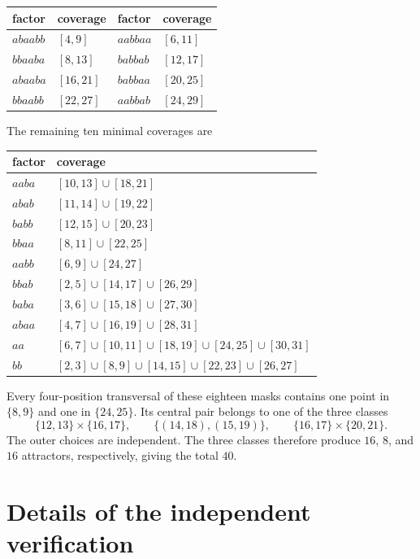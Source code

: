\documentclass[10pt,a4paper]{article}
\theoremstyle{definition}\newtheorem{definition}[theorem]{Definition}
\theoremstyle{remark}\newtheorem{remark}[theorem]{Remark}
\begin{document}
\begin{center}
\begin{tabular}{ll@{\qquad}ll}
\toprule
factor & coverage & factor & coverage\\
\midrule
$abaabb$ & $[4,9]$ & $aabbaa$ & $[6,11]$\\
$bbaaba$ & $[8,13]$ & $babbab$ & $[12,17]$\\
$abaaba$ & $[16,21]$ & $babbaa$ & $[20,25]$\\
$bbaabb$ & $[22,27]$ & $aabbab$ & $[24,29]$\\
\bottomrule
\end{tabular}
\end{center}

The remaining ten minimal coverages are

\begin{center}
\begin{tabular}{ll}
\toprule
factor & coverage\\
\midrule
$aaba$ & $[10,13]\cup[18,21]$\\
$abab$ & $[11,14]\cup[19,22]$\\
$babb$ & $[12,15]\cup[20,23]$\\
$bbaa$ & $[8,11]\cup[22,25]$\\
$aabb$ & $[6,9]\cup[24,27]$\\
$bbab$ & $[2,5]\cup[14,17]\cup[26,29]$\\
$baba$ & $[3,6]\cup[15,18]\cup[27,30]$\\
$abaa$ & $[4,7]\cup[16,19]\cup[28,31]$\\
$aa$ & $[6,7]\cup[10,11]\cup[18,19]\cup[24,25]\cup[30,31]$\\
$bb$ & $[2,3]\cup[8,9]\cup[14,15]\cup[22,23]\cup[26,27]$\\
\bottomrule
\end{tabular}
\end{center}

Every four-position transversal of these eighteen masks contains one point in $\{8,9\}$ and one in $\{24,25\}$.  Its central pair belongs to one of the three classes
\[
 \{12,13\}\times\{16,17\},
 \qquad
 \{(14,18),(15,19)\},
 \qquad
 \{16,17\}\times\{20,21\}.
\]
The outer choices are independent.  The three classes therefore produce $16$, $8$, and $16$ attractors, respectively, giving the total $40$.


\section{Details of the independent verification}
\label{app:independent-verification}
\end{document}
